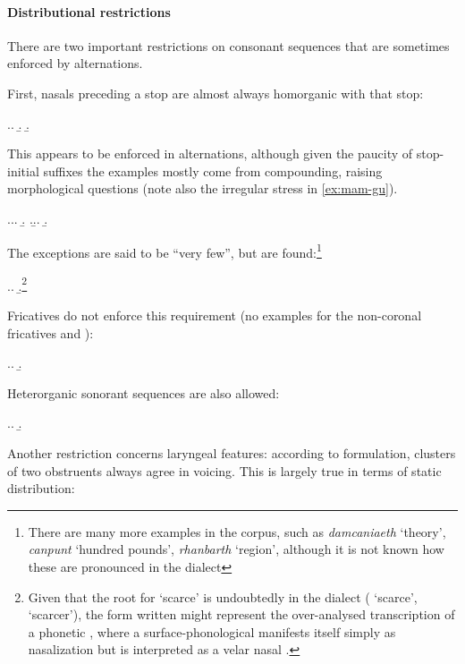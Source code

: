\paragraph{Distributional restrictions}
\label{sec:distr-restr}

There are two important restrictions on consonant sequences that are sometimes enforced by alternations.

First, nasals preceding a stop are almost always homorganic with that stop:

\ex.\a.
\b.
\b.

This appears to be enforced in alternations, although given the paucity of stop\hyp initial suffixes the examples mostly come from compounding, raising morphological questions (note also the irregular stress in \cref{ex:mam-gu}).

\ex.\a.\a.
\b.
\z.\b.\a.
\b.\label{ex:mam-gu}

The exceptions are said to be \enquote{very few}, but are found:\footnote{There are many more examples in the corpus, such as \emph{damcaniaeth} `theory', \emph{canpunt} `hundred pounds', \emph{rhanbarth} `region', although it is not known how these are pronounced in the dialect}

\ex.\a.
\b.\footnote{Given that the root for `scarce' is undoubtedly  in the dialect (\ipa{[ˈprɪn]} `scarce', \ipa{[ˈprɪnaχ]} `scarcer'), the form written \ipa{[ˈprɪŋder]} might represent the over-analysed transcription of a phonetic , where a surface-phonological \ipa{[n]} manifests itself simply as nasalization but is interpreted as a velar nasal \citep[\cfm][]{trigo88}.}

Fricatives do not enforce this requirement (no examples for the non-coronal fricatives \ipa{[f]} and \ipa{[v]}):

\ex.\a.
\b.

Heterorganic sonorant sequences are also allowed:

\ex.\a.
\b.

Another restriction concerns laryngeal features: according to  formulation, clusters of two obstruents always agree in voicing. This is largely true in terms of static distribution:

